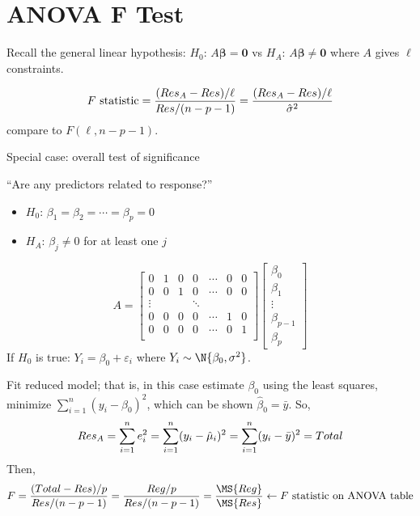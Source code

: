 \section{ANOVA F Test}
Recall the general linear hypothesis:
$ H_0 $: $ A\symbf{\beta}=\symbf{0} $
vs $ H_A $: $ A\symbf{\beta}\neq \symbf{0} $
where $ A $ gives $ \ell $ constraints.

\[ F\text{ statistic}=
    \frac{(\relax{Res}_A-\relax{Res})/\ell}{\relax{Res}/(n-p-1)}=
    \frac{(\relax{Res}_A-\relax{Res})/\ell}{\hat{\sigma}^2}  \]
compare to $ F(\ell,n-p-1) $.

Special case: overall test of significance

``Are any predictors related to response?''
\begin{itemize}
    \item $ H_0 $: $ \beta_1=\beta_2=\cdots=\beta_p=0 $
    \item $ H_A $: $ \beta_j\neq 0 $ for at least one $ j $
\end{itemize}
\[ A=\begin{bmatrix}
        0      & 1 & 0 & 0      & \cdots & 0 & 0 \\
        0      & 0 & 1 & 0      & \cdots & 0 & 0 \\
        \vdots &   &   & \ddots                  \\
        0      & 0 & 0 & 0      & \cdots & 1 & 0 \\
        0      & 0 & 0 & 0      & \cdots & 0 & 1 \\
    \end{bmatrix}\begin{bmatrix}
        \beta_0     \\
        \beta_1     \\
        \vdots      \\
        \beta_{p-1} \\
        \beta_p
    \end{bmatrix} \]
If $ H_0 $ is true: $ Y_i=\beta_0+\varepsilon_i $
where $ Y_i \sim \N{\beta_0,\sigma^2} $.

Fit reduced model; that is, in this case estimate $ \beta_0 $
using the least squares, minimize $ \sum_{i=1}^{n} (y_i-\beta_0)^2 $,
which can be shown $ \hat{\beta}_0=\bar{y} $. So,
\[ \relax{Res}_A
    =\sum_{i=1}^{n} e_i^2
    =\sum_{i=1}^{n} (y_i-\hat{\mu}_i)^2
    =\sum_{i=1}^{n}(y_i-\bar{y})^2
    =\relax{Total} \]
Then,
\[ F=\frac{(\SS{Total}-\SS{Res})/p}{\SS{Res}/(n-p-1)}
    =\frac{\SS{Reg}/p}{\SS{Res}/(n-p-1)}
    =\frac{\MS{Reg}}{\MS{Res}}
    \leftarrow F\text{ statistic on ANOVA table}    \]

